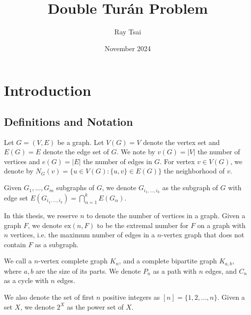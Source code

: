 \documentclass[12pt]{report}
\title{Double Turán Problem}
\author{Ray Tsai}
\date{November 2024}
\begin{document}
\maketitle



\tableofcontents

\chapter{Introduction}

\section{Definitions and Notation}
Let $G = (V, E)$ be a graph. Let $V(G) = V$ denote the vertex set and $E(G) = E$ denote the edge set
of $G$. We note by $v(G) = |V|$ the number of vertices and $e(G) = |E|$ the number of edges in $G$.
For vertex $v \in V(G)$, we denote by $N_G(v) = \{u \in V(G) : \{u, v\} \in E(G)\}$ the neighborhood
of $v$.

Given $G_1, \ldots, G_m$ subgraphs of $G$, we denote $G_{i_1, \ldots, i_k}$ as the subgraph of $G$
with edge set $E(G_{i_1, \ldots, i_k}) = \bigcap_{\alpha = 1}^k E(G_{\alpha})$. 

In this thesis, we reserve $n$ to denote the number of vertices in a graph. Given a graph $F$, we
denote $\text{ex}(n, F)$ to be the extremal number for $F$ on a graph with $n$ vertices, i.e. the
maximum number of edges in a $n$-vertex graph that does not contain $F$ as a subgraph.

We call a $n$-vertex complete graph $K_n$, and a complete bipartite graph $K_{a, b}$, where $a, b$
are the size of its parts. We denote $P_n$ as a path with $n$ edges, and $C_n$ as a cycle with
$n$ edges.

We also denote the set of first $n$ positive integers as $[n] = \{1, 2, \ldots, n\}$. Given a set
$X$, we denote $2^X$ as the power set of $X$.
\end{document}
